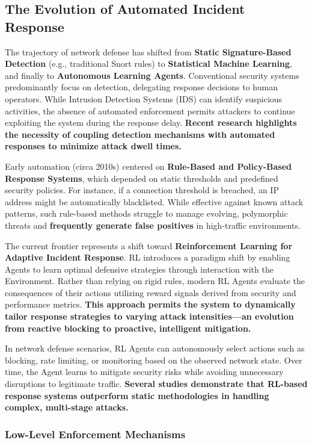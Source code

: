 \documentclass[12pt,a4paper]{report}
\begin{document}
\subsection{The Evolution of Automated Incident Response}

The trajectory of network defense has shifted from \textbf{Static Signature-Based Detection} (e.g., traditional Snort rules) to \textbf{Statistical Machine Learning}, and finally to \textbf{Autonomous Learning Agents}.
Conventional security systems predominantly focus on detection, delegating response decisions to human operators. While Intrusion Detection Systems (IDS) can identify suspicious activities, the absence of automated enforcement permits attackers to continue exploiting the system during the response delay. \textbf{Recent research highlights the necessity of coupling detection mechanisms with automated responses to minimize attack dwell times.}

Early automation (circa 2010s) centered on \textbf{Rule-Based and Policy-Based Response Systems}, which depended on static thresholds and predefined security policies. For instance, if a connection threshold is breached, an IP address might be automatically blacklisted. While effective against known attack patterns, such rule-based methods struggle to manage evolving, polymorphic threats and \textbf{frequently generate false positives} in high-traffic environments.

The current frontier represents a shift toward \textbf{Reinforcement Learning for Adaptive Incident Response}. RL introduces a paradigm shift by enabling Agents to learn optimal defensive strategies through interaction with the Environment. Rather than relying on rigid rules, modern RL Agents evaluate the consequences of their actions utilizing reward signals derived from security and performance metrics. \textbf{This approach permits the system to dynamically tailor response strategies to varying attack intensities—an evolution from reactive blocking to proactive, intelligent mitigation.}

In network defense scenarios, RL Agents can autonomously select actions such as blocking, rate limiting, or monitoring based on the observed network state. Over time, the Agent learns to mitigate security risks while avoiding unnecessary disruptions to legitimate traffic. \textbf{Several studies demonstrate that RL-based response systems outperform static methodologies in handling complex, multi-stage attacks.}

\subsubsection*{Low-Level Enforcement Mechanisms}
\end{document}
